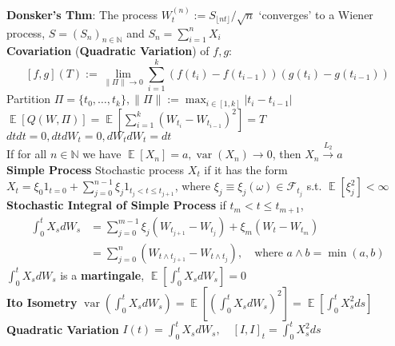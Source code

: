 \documentclass[10pt,landscape, a4paper]{article}
\theoremstyle{remark}
\newcommand{\var}{\operatorname{var}}
\newcommand{\E}{\operatorname{\mathbb{E}}}
\newcommand{\abs}[1]{\left\lvert #1 \right\rvert}
\newcommand{\F}{\mathcal{F}}
\begin{document}
\begin{multicols*}{3}
\textbf{Donsker's Thm}: The process $W_t^{(n)} := S_{\lfloor nt \rfloor} / \sqrt{n}$ `converges' to a Wiener process, $S = (S_n)_{n \in \mathbb{N}}$ and $S_n = \sum_{i=1}^n X_i$\\

\textbf{Covariation} (\textbf{Quadratic Variation}) of $f, g$: 
\vspace{-3pt}
$$[f, g](T) := \lim_{\lVert \Pi \rVert \to 0} \sum_{i=1}^k ( f(t_i) - f(t_{i-1})) (g(t_i) - g(t_{i-1}))$$
Partition $\Pi = \{t_0 , \dots , t_k \}, \lVert \Pi \rVert := \max_{i\in [1, k]}\abs{t_i - t_{i-1}}$\\
$\E [Q(W, \Pi)] = \E[\sum^k_{i=1} (W_{t_i} - W_{t_{i-1}})^2 ] = T$\\
$dtdt = 0, dt dW_t = 0, dW_t dW_t = dt$\\
\vspace{-3pt}
If for all $n \in \mathbb{N}$ we have $\E [X_n] = a, \var (X_n) \to 0$, then $X_n \xrightarrow{L_2 } a$\\

\textbf{Simple Process} Stochastic process $X_t$ if it has the form $X_t = \xi_0 1_{t=0} + \sum^{n-1}_{j=0} \xi_j 1_{t_j < t \leq t_{j+1}}$, where $\xi_j \equiv \xi_j (\omega) \in \F_{t_j}$  s.t. $\E [\xi^2_j] < \infty$ \\

\textbf{Stochastic Integral of Simple Process} if $t_m < t \leq t_{m+1}$,
\begin{align*}
    \int^t_0 X_s dW_s &= \sum^{m-1}_{j=0} \xi_j (W_{t_{j+1}} - W_{t_j}) + \xi_m (W_t - W_{t_m})\\
    &= \sum^{n}_{j=0} (W_{t\wedge t_{j+1}} - W_{t\wedge t_j}), \quad \text{where }a\wedge b = \min(a, b) 
\end{align*}
$\int^t_0 X_s dW_s$ is a \textbf{martingale}, $\E [\int^t_0 X_s dW_s] = 0$\\
\textbf{Ito Isometry} $\var (\int^t_0 X_s dW_s) = \E [(\int^t_0 X_s dW_s)^2] = \E [\int^t_0 X^2_s ds]$\\
\textbf{Quadratic Variation} $I (t) = \int^t_0 X_s dW_s, \quad [I, I]_t = \int^t_0 X^2_s ds$\\


\end{multicols*}
\end{document}
